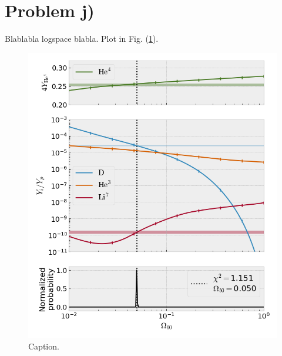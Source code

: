 \documentclass[reprint,english,notitlepage]{revtex4-1}  %
\numberwithin{equation}{section}
\begin{document}
\section{Problem j)}
Blablabla logspace blabla. Plot in Fig. (\ref{fig:problem_j}).
\begin{figure}[h]
	\includegraphics[width=\columnwidth]{relic_abundances_j.png}
	\caption{Caption.}
	\label{fig:problem_j}
\end{figure}
\end{document}
